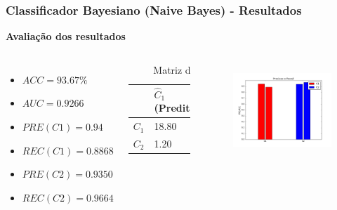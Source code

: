 \documentclass{beamer}
\begin{document}
\begin{frame}
\frametitle{Classificador Bayesiano (Naive Bayes) - Resultados}

\textbf{Avaliação dos resultados}
\begin{columns}[c] 
\begin{itemize}
\item $ACC = 93.67 \%$
\item $AUC = 0.9266 $

\item $PRE(C1) = 0.94$
\item $REC(C1) = 0.8868$
\item $PRE(C2) = 0.9350$
\item $REC(C2) = 0.9664$
\end{itemize}

\begin{table}
\begin{tabular}{l l l}
\toprule
 & \textbf{$\hat{C}_1$ (Predita)} & \textbf{$\hat{C}_2$(Predita)}\\
\midrule
$C_1$ & 18.80&2.40\\ 
$C_2$ &  1.20&34.50\\ 
\bottomrule
\end{tabular}
\caption{Matriz de confusão}
\end{table}


\begin{figure}[H]
\centering
  \includegraphics[width=\linewidth]{../img/naive_bayes_rec.png}
  \label{fig:percep}
\end{figure}%

\end{columns}

\end{frame}
\end{document}
